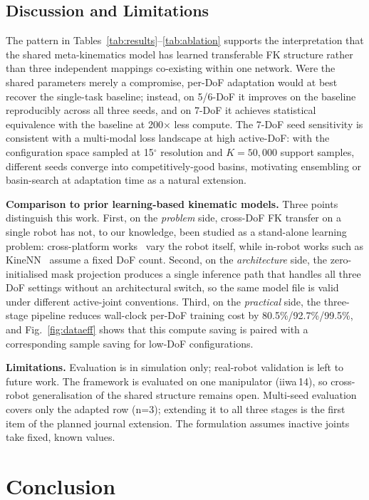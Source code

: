 \documentclass[conference]{IEEEtran}
\begin{document}
\subsection{Discussion and Limitations}

The pattern in Tables~\ref{tab:results}--\ref{tab:ablation} supports the interpretation that the shared meta-kinematics model has learned transferable FK structure rather than three independent mappings co-existing within one network. Were the shared parameters merely a compromise, per-DoF adaptation would at best recover the single-task baseline; instead, on 5/6-DoF it improves on the baseline reproducibly across all three seeds, and on 7-DoF it achieves statistical equivalence with the baseline at 200$\times$ less compute. The 7-DoF seed sensitivity is consistent with a multi-modal loss landscape at high active-DoF: with the configuration space sampled at 15$^\circ$ resolution and $K\!=\!50{,}000$ support samples, different seeds converge into competitively-good basins, motivating ensembling or basin-search at adaptation time as a natural extension.

\textbf{Comparison to prior learning-based kinematic models.} Three points distinguish this work. First, on the \emph{problem} side, cross-DoF FK transfer on a single robot has not, to our knowledge, been studied as a stand-alone learning problem: cross-platform works~\cite{devin2017,chen2018,ghadirzadeh2021} vary the robot itself, while in-robot works such as KineNN~\cite{diprasetya2025} assume a fixed DoF count. Second, on the \emph{architecture} side, the zero-initialised mask projection produces a single inference path that handles all three DoF settings without an architectural switch, so the same model file is valid under different active-joint conventions. Third, on the \emph{practical} side, the three-stage pipeline reduces wall-clock per-DoF training cost by 80.5\%/92.7\%/99.5\%, and Fig.~\ref{fig:dataeff} shows that this compute saving is paired with a corresponding sample saving for low-DoF configurations.

\textbf{Limitations.} Evaluation is in simulation only; real-robot validation is left to future work. The framework is evaluated on one manipulator (iiwa\,14), so cross-robot generalisation of the shared structure remains open. Multi-seed evaluation covers only the adapted row (n=3); extending it to all three stages is the first item of the planned journal extension. The formulation assumes inactive joints take fixed, known values.

\section{Conclusion}\label{sec:conclusion}
\end{document}
